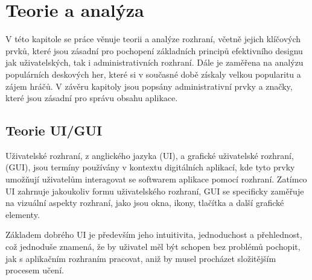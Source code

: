 \chapter{Teorie a analýza}
\label{ch:theory_and_analysis}
V této kapitole se práce věnuje teorii a analýze rozhraní, včetně jejich klíčových prvků, které jsou zásadní pro pochopení základních principů efektivního designu jak uživatelských, tak i administrativních rozhraní. Dále je zaměřena na analýzu populárních deskových her, které si v současné době získaly velkou popularitu a zájem hráčů. V závěru kapitoly jsou popsány administrativní prvky a značky, které jsou zásadní pro správu obsahu aplikace.

\section{Teorie UI/GUI}
\label{sec:ui-gui-theory}
Uživatelské rozhraní, z anglického jazyka \textit{} (UI), a grafické uživatelské rozhraní, \textit{} (GUI), jsou termíny používány v kontextu digitálních aplikací, kde tyto prvky umožňují uživatelům interagovat se softwarem aplikace pomocí rozhraní. Zatímco UI zahrnuje jakoukoliv formu uživatelského rozhraní, GUI se specificky zaměřuje na vizuální aspekty rozhraní, jako jsou okna, ikony, tlačítka a další grafické elementy.

Základem dobrého UI je především jeho intuitivita, jednoduchost a přehlednost, což jednoduše znamená, že by uživatel měl být schopen bez problémů pochopit, jak s aplikačním rozhraním pracovat, aniž by musel procházet složitějším procesem učení.

